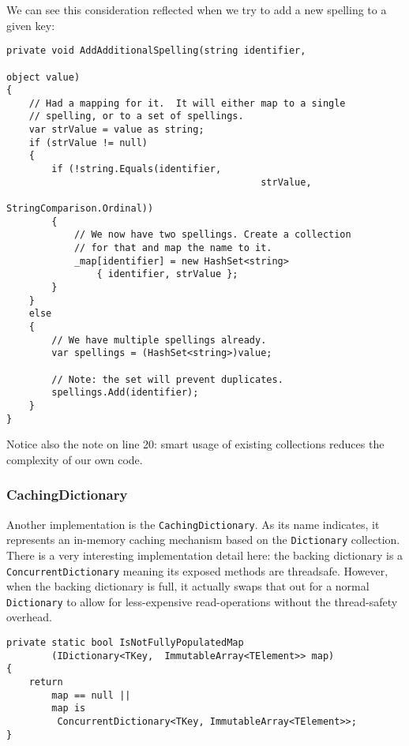 \begin{minipage}{\linewidth}
We can see this consideration reflected when we try to add a new spelling to a given key:

\begin{lstlisting}
private void AddAdditionalSpelling(string identifier, 
																	 object value)
{
	// Had a mapping for it.  It will either map to a single 
	// spelling, or to a set of spellings.
	var strValue = value as string;
	if (strValue != null)
	{
		if (!string.Equals(identifier, 
											 strValue, 
											 StringComparison.Ordinal))
		{
			// We now have two spellings. Create a collection 
			// for that and map the name to it.
			_map[identifier] = new HashSet<string> 
				{ identifier, strValue };
		}
	}
	else
	{
		// We have multiple spellings already.
		var spellings = (HashSet<string>)value;

		// Note: the set will prevent duplicates.
		spellings.Add(identifier);
	}
}
\end{lstlisting}
\end{minipage}

Notice also the note on line 20: smart usage of existing collections reduces the complexity of our own code.

\newpage
\subsubsection{CachingDictionary}
\label{sec:spec-coll-cachingdictionary}

Another implementation is the \texttt{CachingDictionary}. As its name indicates, it represents an in-memory caching mechanism based on the \texttt{Dictionary} collection. There is a very interesting implementation detail here: the backing dictionary is a \texttt{ConcurrentDictionary} meaning its exposed methods are \gls{threadsafe}. However, when the backing dictionary is full, it actually swaps that out for a normal \texttt{Dictionary} to allow for less-expensive read-operations without the thread-safety overhead.

\begin{lstlisting}
private static bool IsNotFullyPopulatedMap
		(IDictionary<TKey,	ImmutableArray<TElement>> map)
{
	return 
		map == null || 
		map is 
		 ConcurrentDictionary<TKey, ImmutableArray<TElement>>;
}
\end{lstlisting}